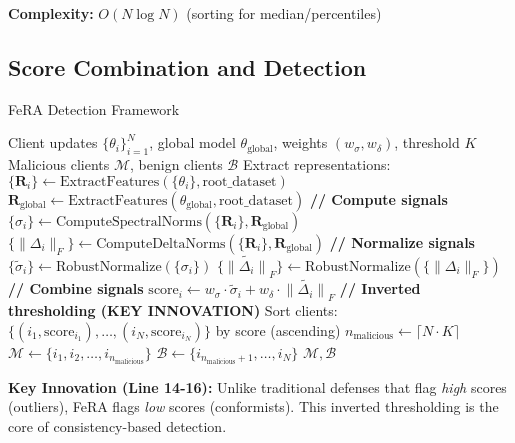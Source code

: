 \documentclass[11pt,a4paper]{article}
\begin{document}
\textbf{Complexity:} $O(N \log N)$ (sorting for median/percentiles)

\subsection{Score Combination and Detection}

\begin{algorithm}[H]
\caption{FeRA Detection Framework}
\label{alg:fera}
\begin{algorithmic}[1]
\Require Client updates $\{\theta_i\}_{i=1}^{N}$, global model $\theta_{\text{global}}$, weights $(w_\sigma, w_\delta)$, threshold $K$
\Ensure Malicious clients $\mathcal{M}$, benign clients $\mathcal{B}$
\State Extract representations: $\{\mathbf{R}_i\} \leftarrow \text{ExtractFeatures}(\{\theta_i\}, \text{root\_dataset})$
\State $\mathbf{R}_{\text{global}} \leftarrow \text{ExtractFeatures}(\theta_{\text{global}}, \text{root\_dataset})$
\State
\State \textbf{// Compute signals}
\State $\{\sigma_i\} \leftarrow \text{ComputeSpectralNorms}(\{\mathbf{R}_i\}, \mathbf{R}_{\text{global}})$ 
\State $\{\|\Delta_i\|_F\} \leftarrow \text{ComputeDeltaNorms}(\{\mathbf{R}_i\}, \mathbf{R}_{\text{global}})$ 
\State
\State \textbf{// Normalize signals}
\State $\{\tilde{\sigma}_i\} \leftarrow \text{RobustNormalize}(\{\sigma_i\})$ 
\State $\{\tilde{\|\Delta_i\|}_F\} \leftarrow \text{RobustNormalize}(\{\|\Delta_i\|_F\})$ 
\State
\State \textbf{// Combine signals}
    \State $\text{score}_i \leftarrow w_\sigma \cdot \tilde{\sigma}_i + w_\delta \cdot \tilde{\|\Delta_i\|}_F$
\EndFor
\State
\State \textbf{// Inverted thresholding (KEY INNOVATION)}
\State Sort clients: $\{(i_1, \text{score}_{i_1}), \ldots, (i_N, \text{score}_{i_N})\}$ by score (ascending)
\State $n_{\text{malicious}} \leftarrow \lceil N \cdot K \rceil$
\State $\mathcal{M} \leftarrow \{i_1, i_2, \ldots, i_{n_{\text{malicious}}}\}$ 
\State $\mathcal{B} \leftarrow \{i_{n_{\text{malicious}}+1}, \ldots, i_N\}$ 
\State \Return $\mathcal{M}, \mathcal{B}$
\end{algorithmic}
\end{algorithm}

\textbf{Key Innovation (Line 14-16):} Unlike traditional defenses that flag \emph{high} scores (outliers), FeRA flags \emph{low} scores (conformists). This inverted thresholding is the core of consistency-based detection.
\end{document}
